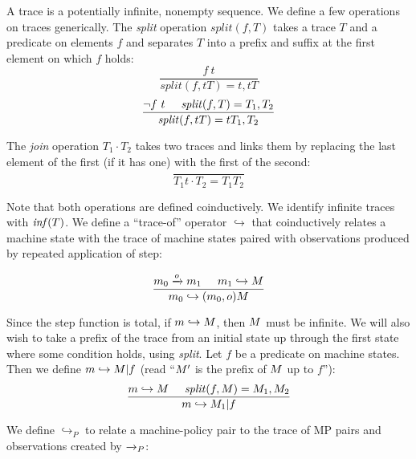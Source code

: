 \documentclass[conference]{IEEEtran}
\begin{document}
    A trace is a potentially infinite, nonempty sequence. We define a few operations on traces generically.
    The {\it split} operation \(\mathit{split}(f,T)\) takes a trace \(T\) and a predicate on elements \(f\) and
    separates \(T\) into a prefix and suffix at the first element on which \(f\) holds:
    \[\frac{f\ t}
           {\mathit{split}(f,tT) = t, tT}\]
    \[\frac{\neg f\ t \hspace{.5cm} \mathit{split}(f,T) = T_1,T_2}
           {\mathit{split}(f,tT) = tT_1,T_2}\]

    The {\it join} operation \(T_1 \cdot T_2\) takes two traces and links them by replacing the last element
    of the first (if it has one) with the first of the second:
    \[\frac{}
           {T_1t \cdot T_2 = T_1 T_2}\]

    Note that both operations are defined coinductively. We identify infinite traces with \(\mathit{inf}(T)\).
    We define a ``trace-of'' operator \(\hookrightarrow\) that coinductively relates a machine state with the
    trace of machine states paired with observations produced by repeated application of step:

    \[\frac{m_0 \xrightarrow{o} m_1 \hspace{.5cm} m_1 \hookrightarrow M}
           {m_0 \hookrightarrow (m_0,o) M}\]

    Since the step function is total, if \(m \hookrightarrow M\), then \(M\) must be infinite.
    We will also wish to take a prefix of the trace from an initial state up through the first state where
    some condition holds, using {\it split}. Let \(f\) be a predicate on machine states. Then we define
    \(m \hookrightarrow M | f\) (read ``\(M'\) is the prefix of \(M\) up to \(f\)''):
    \[\frac{m \hookrightarrow M \hspace{.5cm} \mathit{split}(f,M) = M_1,M_2}
           {m \hookrightarrow M_1 | f}\]


    We define \(\hookrightarrow_P\) to relate a machine-policy pair to the trace of MP pairs and observations
    created by \(\xrightarrow{}_P\):
\end{document}
